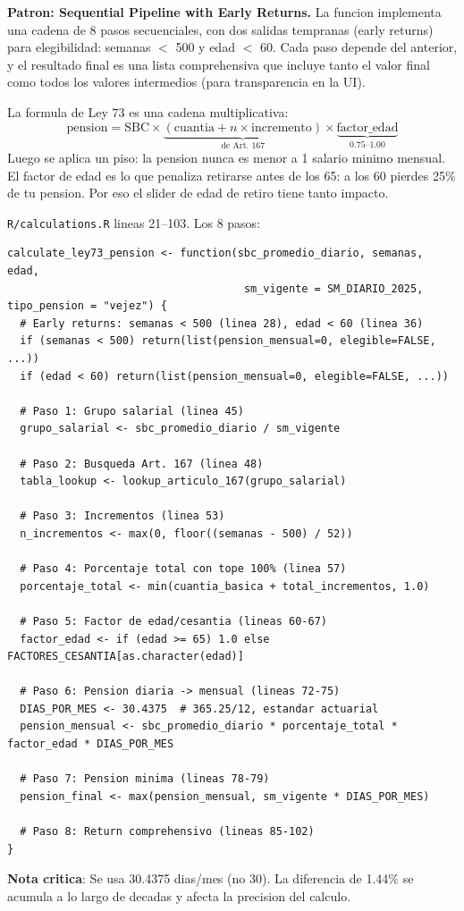 \documentclass[11pt, letterpaper, twoside]{report}
\begin{document}
\begin{patronbox}
\textbf{Patron: Sequential Pipeline with Early Returns.} La funcion implementa
una cadena de 8 pasos secuenciales, con dos salidas tempranas (early returns) para
elegibilidad: semanas $<$ 500 y edad $<$ 60. Cada paso depende del anterior, y el
resultado final es una lista comprehensiva que incluye tanto el valor final como
todos los valores intermedios (para transparencia en la UI).
\end{patronbox}

\begin{intuicionbox}
La formula de Ley 73 es una cadena multiplicativa:
$$\text{pension} = \text{SBC} \times \underbrace{(\text{cuantia} + n \times \text{incremento})}_{\text{de Art. 167}} \times \underbrace{\text{factor\_edad}}_{\text{0.75--1.00}}$$
Luego se aplica un piso: la pension nunca es menor a 1 salario minimo mensual.
El factor de edad es lo que penaliza retirarse antes de los 65: a los 60 pierdes 25\%
de tu pension. Por eso el slider de edad de retiro tiene tanto impacto.
\end{intuicionbox}

\begin{codigobox}
\texttt{R/calculations.R} lineas 21--103. Los 8 pasos:
\begin{lstlisting}[caption={Cadena de Ley 73}]
calculate_ley73_pension <- function(sbc_promedio_diario, semanas, edad,
                                     sm_vigente = SM_DIARIO_2025, tipo_pension = "vejez") {
  # Early returns: semanas < 500 (linea 28), edad < 60 (linea 36)
  if (semanas < 500) return(list(pension_mensual=0, elegible=FALSE, ...))
  if (edad < 60) return(list(pension_mensual=0, elegible=FALSE, ...))

  # Paso 1: Grupo salarial (linea 45)
  grupo_salarial <- sbc_promedio_diario / sm_vigente

  # Paso 2: Busqueda Art. 167 (linea 48)
  tabla_lookup <- lookup_articulo_167(grupo_salarial)

  # Paso 3: Incrementos (linea 53)
  n_incrementos <- max(0, floor((semanas - 500) / 52))

  # Paso 4: Porcentaje total con tope 100% (linea 57)
  porcentaje_total <- min(cuantia_basica + total_incrementos, 1.0)

  # Paso 5: Factor de edad/cesantia (lineas 60-67)
  factor_edad <- if (edad >= 65) 1.0 else FACTORES_CESANTIA[as.character(edad)]

  # Paso 6: Pension diaria -> mensual (lineas 72-75)
  DIAS_POR_MES <- 30.4375  # 365.25/12, estandar actuarial
  pension_mensual <- sbc_promedio_diario * porcentaje_total * factor_edad * DIAS_POR_MES

  # Paso 7: Pension minima (lineas 78-79)
  pension_final <- max(pension_mensual, sm_vigente * DIAS_POR_MES)

  # Paso 8: Return comprehensivo (lineas 85-102)
}
\end{lstlisting}
\textbf{Nota critica}: Se usa 30.4375 dias/mes (no 30). La diferencia de 1.44\%
se acumula a lo largo de decadas y afecta la precision del calculo.
\end{codigobox}
\end{document}
